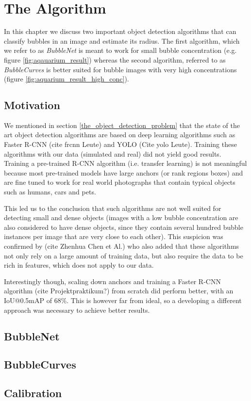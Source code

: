 \chapter{The Algorithm} \label{the_algorithm}
	In this chapter we discuss two important object detection algorithms that can classify bubbles in an image and estimate its radius. The first algorithm, which we refer to as \textit{BubbleNet} is meant to work for small bubble concentration (e.g. figure \ref{fig:aqauarium_result}) whereas the second algorithm, referred to as \textit{BubbleCurves} is better suited for bubble images with very high concentrations (figure \ref{fig:aquarium_result_high_conc}).
		
	\section{Motivation}
		We mentioned in section \ref{the_object_detection_problem} that the state of the art object detection algorithms are based on deep learning algorithms such as Faster R-CNN (cite frcnn Leute) and YOLO (Cite yolo Leute). Training these algorithms with our data (simulated and real) did not yield good results. Training a pre-trained R-CNN algorithm (i.e. transfer learning) is not meaningful because most pre-trained models have large anchors (or rank regions boxes) and are fine tuned to work for real world photographs that contain typical objects such as humans, cars and pets. 
		
		This led us to the conclusion that such algorithms are not well suited for detecting small and dense objects (images with a low bubble concentration are also considered to have dense objects, since they contain several hundred bubble instances per image that are very close to each other). This suspicion was confirmed by (cite Zhenhua Chen et Al.) who also added that these algorithms not only rely on a large amount of training data, but also require the data to be rich in features, which does not apply to our data. 
		
	Interestingly though, scaling down anchors and training a Faster R-CNN algorithm (cite Projektpraktikum?)  from scratch did perform better, with an IoU@0.5mAP of 68\%. This is however far from ideal, so a developing a different approach was necessary to achieve better results. 
		
		
		
		
	\section{BubbleNet}\label{BubbleNet}
	\section{BubbleCurves}
	\section{Calibration}\label{calibration_algorithm}